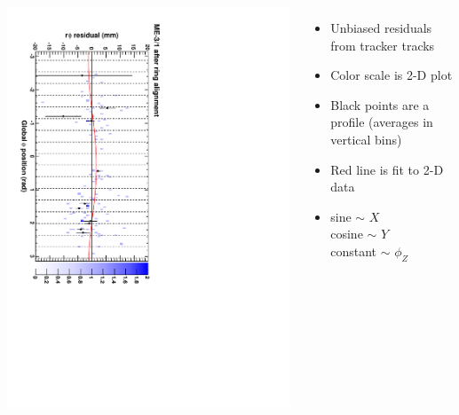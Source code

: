 \documentclass[compress]{beamer}
\begin{document}
\begin{frame}
\begin{columns}
\includegraphics[height=\linewidth, angle=90]{ringfits_after/mem31.pdf}
\begin{itemize}
\item Unbiased residuals from tracker tracks
\item Color scale is 2-D plot
\item Black points are a profile (averages in vertical bins)
\item Red line is fit to 2-D data
\item sine $\sim$ $X$ \\
cosine $\sim$ $Y$ \\
constant $\sim$ $\phi_Z$
\end{itemize}
\end{columns}
\end{frame}
\end{document}
